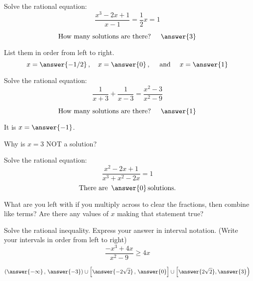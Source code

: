 \documentclass{ximera}
\author{Carl Stitz \and Jeff Zeager \and  Bobby Ramsey}
\begin{document}
\begin{exercise}
	Solve the rational equation:
	\[ \frac{x^3-2x+1}{x-1} = \frac{1}{2} x = 1 \]
	
	\[ \text{How many solutions are there? } \quad \answer{3} \]
	\begin{exercise}
		List them in order from left to right.
		\[ x = \answer{-1/2} \, , \quad x = \answer{0} \, , \quad \text{ and } \quad x=\answer{1} \]
	\end{exercise}
\end{exercise}


\begin{exercise}
	Solve the rational equation:
	\[ \frac{1}{x+3} + \frac{1}{x-3} = \frac{x^2-3}{x^2-9} \]
	
	\[ \text{How many solutions are there? } \quad \answer{1} \]
	\begin{exercise}
		It is $x = \answer{-1}$.
		\begin{exercise}
			Why is $x=3$ NOT a solution?
			\begin{multipleChoice}
			\end{multipleChoice}
		\end{exercise}
	\end{exercise}
\end{exercise}

\begin{exercise}
	Solve the rational equation:
	\[ \frac{x^2-2x+1}{x^3+x^2-2x} = 1 \]
	\[ \text{There are } \, \answer{0} \, \text{solutions.} \]
	\begin{feedback}
		What are you left with if you multiply across to clear the fractions, then combine like terms?  Are there any values of $x$ making that statement true?	
	\end{feedback}		
\end{exercise}

\begin{exercise}
	Solve the rational inequality.  Express your answer in interval notation.  (Write your intervals in order from left to right)
	\[ \frac{-x^3+4x}{x^2-9} \geq 4x  \]
	
	\[ \left( \answer{-\infty} \, , \, \answer{-3} \right) \cup \left[ \answer{-2\sqrt{2}} \, , \, \answer{0} \right] \cup \left[ \answer{2\sqrt{2}} , \answer{3} \right) \]
		
\end{exercise}
\end{document}

